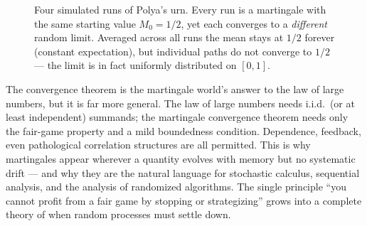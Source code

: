 \begin{figure}[H]
\centering
{}
\caption{Four simulated runs of Polya's urn. Every run is a martingale with the same starting value
$M_0 = 1/2$, yet each converges to a \emph{different} random limit. Averaged across all runs the mean
stays at $1/2$ forever (constant expectation), but individual paths do not converge to $1/2$ --- the limit is
in fact uniformly distributed on $[0,1]$.}
\label{ch28:fig-polya}
\end{figure}

\begin{aestheticbox}
The convergence theorem is the martingale world's answer to the law of large numbers, but it is far
more general. The law of large numbers needs i.i.d.\ (or at least independent) summands; the martingale
convergence theorem needs only the fair-game property and a mild boundedness condition. Dependence,
feedback, even pathological correlation structures are all permitted. This is why martingales appear
wherever a quantity evolves with memory but no systematic drift --- and why they are the natural
language for stochastic calculus, sequential analysis, and the analysis of randomized algorithms. The
single principle ``you cannot profit from a fair game by stopping or strategizing'' grows
into a complete theory of when random processes must settle down.
\end{aestheticbox}

